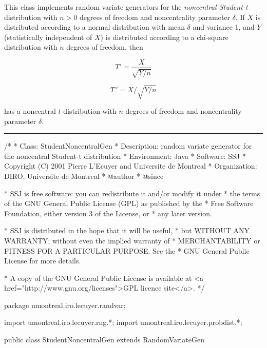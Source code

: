 
This class implements random variate generators for the 
\emph{noncentral Student-t} distribution with $n>0$ degrees of freedom and
noncentrality parameter $\delta$. If $X$ is distributed according to a 
normal distribution with mean  $\delta$ and variance 1, and $Y$ (statistically
independent of $X$) is distributed according to a chi-square distribution 
with $n$ degrees of freedom, then
\begin{latexonly}%
\[
             T{'} = \frac{X}{\sqrt{Y/n}}
\]
\end{latexonly}%
\begin{htmlonly}%
\[
             T\,' = {X} / {\sqrt{Y/n}}
\]
\end{htmlonly}%
has a noncentral $t$-distribution with $n$ degrees of freedom and 
noncentrality parameter  $\delta$.


\bigskip\hrule

\begin{code}
\begin{hide}
/*
 * Class:        StudentNoncentralGen
 * Description:  random variate generator for the noncentral Student-t distribution
 * Environment:  Java
 * Software:     SSJ 
 * Copyright (C) 2001  Pierre L'Ecuyer and Universite de Montreal
 * Organization: DIRO, Universite de Montreal
 * @author       
 * @since

 * SSJ is free software: you can redistribute it and/or modify it under
 * the terms of the GNU General Public License (GPL) as published by the
 * Free Software Foundation, either version 3 of the License, or
 * any later version.

 * SSJ is distributed in the hope that it will be useful,
 * but WITHOUT ANY WARRANTY; without even the implied warranty of
 * MERCHANTABILITY or FITNESS FOR A PARTICULAR PURPOSE.  See the
 * GNU General Public License for more details.

 * A copy of the GNU General Public License is available at
   <a href="http://www.gnu.org/licenses">GPL licence site</a>.
 */
\end{hide}
package umontreal.iro.lecuyer.randvar;\begin{hide}
import umontreal.iro.lecuyer.rng.*;
import umontreal.iro.lecuyer.probdist.*;
\end{hide}

public class StudentNoncentralGen extends RandomVariateGen \begin{hide} {
   private NormalGen normgen;
   private ChiSquareGen chigen;
   private int n;   // degrees of freedom of chi-square

   public double nextDouble()  {
      double x = normgen.nextDouble();
      double y = chigen.nextDouble();
      return x / Math.sqrt(y/n);
   }
\end{hide}
\end{code}

